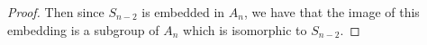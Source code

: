 \documentclass{exam}
\begin{document}
\begin{questions}
\begin{proof}
  Then since $S_{n-2}$ is embedded in $A_n$, we have that the image of this embedding is a subgroup of $A_n$ which is isomorphic to $S_{n-2}$.
\end{proof}


\end{questions}
\end{document}
